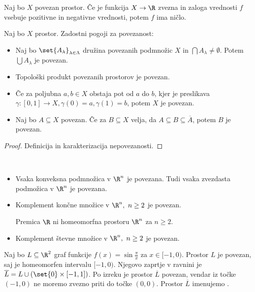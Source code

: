 \begin{posledica}
    Naj bo $X$ povezan prostor. Če je funkcija $X \to \R$ zvezna in zaloga vrednosti $f$ vsebuje pozitivne in negativne vrednosti, potem $f$ ima ničlo.
\end{posledica}

\begin{izrek}
    Naj bo $X$ prostor. Zadostni pogoji za povezanost:
    \begin{itemize}
        \item Naj bo $\set{A_\lambda}_{\lambda \in \Lambda}$ družina povezanih podmnožic $X$ in $\bigcap A_\lambda \neq \emptyset$. Potem $\bigcup A_\lambda$ je povezan.
        \item Topološki produkt povezanih prostorov je povezan.
        \item Če za poljubna $a,b \in X$ obstaja pot od $a$ do $b$, kjer  je preslikava $\gamma: [0,1] \to X, \gamma(0) = a, \gamma(1) = b$, potem $X$ je povezan.
        \item Naj bo $A \subseteq X$ povezan. Če za $B \subseteq X$ velja, da $A \subseteq B \subseteq \overline{A}$, potem $B$ je povezan.
    \end{itemize}
\end{izrek}

\begin{proof}
    Definicija in karakterizacija nepovezanosti.
\end{proof}

\begin{primer}
    \ 
    \begin{itemize}
        \item Vsaka konveksna podmnožica v $\R^n$ je povezana. Tudi vsaka zvezdasta podmožica v $\R^n$ je povezana.
        \item Komplement končne množice v $\R^n, \ n \geq 2$ je povezan.
        \begin{posledica}
            Premica $\R$ ni homeomorfna prostoru $\R^n$ za $n \geq 2$.
        \end{posledica}
        \item Komplement števne množice v $\R^n, \ n \geq 2$ je povezan.
    \end{itemize}
\end{primer}

\begin{primer}
    Naj bo $L \subseteq \R^2$ graf funkcije $f(x) = \sin \frac{\pi}{x}$ za $x \in [-1,0)$. Prostor $L$ je povezan, saj je homeomorfen intervalu $[-1,0)$. Njegovo zaprtje v ravnini je $\overline{L} = L \cup (\set{0} \times [-1,1])$. Po izreku je prostor $\overline{L}$ povezan, vendar iz točke $(-1,0)$ ne moremo zvezno priti do točke $(0,0)$. Prostor $\overline{L}$ imenujemo .
\end{primer}

